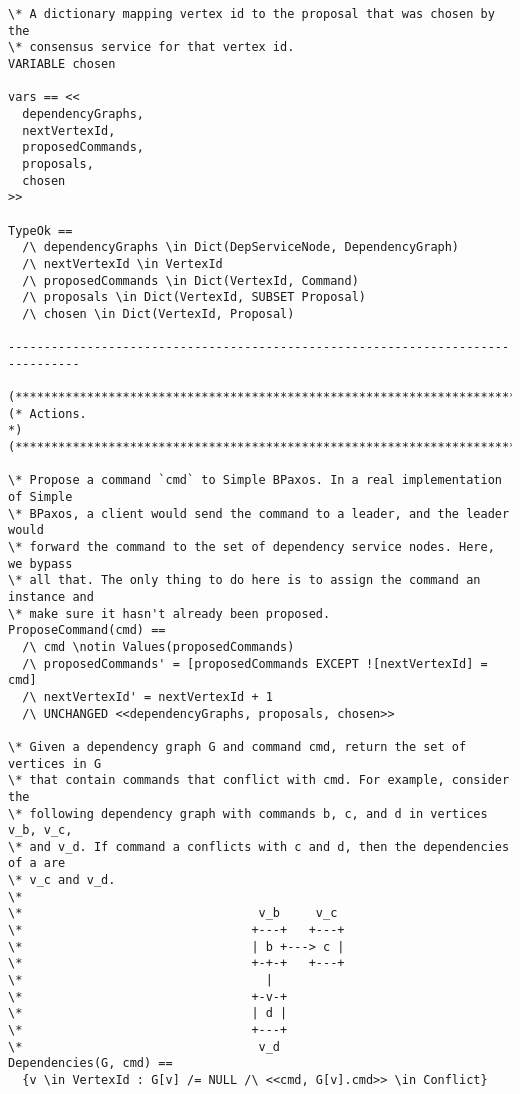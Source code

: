 \begin{verbatim}
\* A dictionary mapping vertex id to the proposal that was chosen by the
\* consensus service for that vertex id.
VARIABLE chosen

vars == <<
  dependencyGraphs,
  nextVertexId,
  proposedCommands,
  proposals,
  chosen
>>

TypeOk ==
  /\ dependencyGraphs \in Dict(DepServiceNode, DependencyGraph)
  /\ nextVertexId \in VertexId
  /\ proposedCommands \in Dict(VertexId, Command)
  /\ proposals \in Dict(VertexId, SUBSET Proposal)
  /\ chosen \in Dict(VertexId, Proposal)

--------------------------------------------------------------------------------

(******************************************************************************)
(* Actions.                                                                   *)
(******************************************************************************)

\* Propose a command `cmd` to Simple BPaxos. In a real implementation of Simple
\* BPaxos, a client would send the command to a leader, and the leader would
\* forward the command to the set of dependency service nodes. Here, we bypass
\* all that. The only thing to do here is to assign the command an instance and
\* make sure it hasn't already been proposed.
ProposeCommand(cmd) ==
  /\ cmd \notin Values(proposedCommands)
  /\ proposedCommands' = [proposedCommands EXCEPT ![nextVertexId] = cmd]
  /\ nextVertexId' = nextVertexId + 1
  /\ UNCHANGED <<dependencyGraphs, proposals, chosen>>

\* Given a dependency graph G and command cmd, return the set of vertices in G
\* that contain commands that conflict with cmd. For example, consider the
\* following dependency graph with commands b, c, and d in vertices v_b, v_c,
\* and v_d. If command a conflicts with c and d, then the dependencies of a are
\* v_c and v_d.
\*
\*                                 v_b     v_c
\*                                +---+   +---+
\*                                | b +---> c |
\*                                +-+-+   +---+
\*                                  |
\*                                +-v-+
\*                                | d |
\*                                +---+
\*                                 v_d
Dependencies(G, cmd) ==
  {v \in VertexId : G[v] /= NULL /\ <<cmd, G[v].cmd>> \in Conflict}


\end{verbatim}
